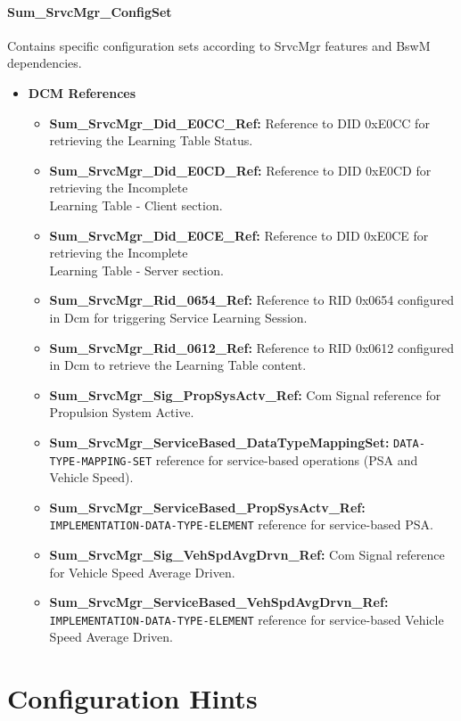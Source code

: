 \paragraph{Sum\_SrvcMgr\_ConfigSet} Contains specific configuration sets according to SrvcMgr features and BswM dependencies.
\begin{itemize}
  \item \textbf{DCM References}
    \begin{itemize}
      \item \textbf{Sum\_SrvcMgr\_Did\_E0CC\_Ref:} Reference to DID 0xE0CC for retrieving the Learning Table Status.
      \item \textbf{Sum\_SrvcMgr\_Did\_E0CD\_Ref:} Reference to DID 0xE0CD for retrieving the Incomplete \\ Learning Table - Client section.
      \item \textbf{Sum\_SrvcMgr\_Did\_E0CE\_Ref:} Reference to DID 0xE0CE for retrieving the Incomplete \\ Learning Table - Server section.
      \item \textbf{Sum\_SrvcMgr\_Rid\_0654\_Ref:} Reference to RID 0x0654 configured in Dcm for triggering Service Learning Session.
      \item \textbf{Sum\_SrvcMgr\_Rid\_0612\_Ref:} Reference to RID 0x0612 configured in Dcm to retrieve the Learning Table content.
      \item \textbf{Sum\_SrvcMgr\_Sig\_PropSysActv\_Ref:} Com Signal reference for Propulsion System Active.
      \item \textbf{Sum\_SrvcMgr\_ServiceBased\_DataTypeMappingSet:} \texttt{DATA-TYPE-MAPPING-SET} reference for service-based operations (PSA and Vehicle Speed).
      \item \textbf{Sum\_SrvcMgr\_ServiceBased\_PropSysActv\_Ref:} \texttt{IMPLEMENTATION-DATA-TYPE-ELEMENT} reference for service-based PSA.
      \item \textbf{Sum\_SrvcMgr\_Sig\_VehSpdAvgDrvn\_Ref:} Com Signal reference for Vehicle Speed Average Driven.
      \item \textbf{Sum\_SrvcMgr\_ServiceBased\_VehSpdAvgDrvn\_Ref:} \texttt{IMPLEMENTATION-DATA-TYPE-ELEMENT} reference for service-based Vehicle Speed Average Driven.     
    \end{itemize}
\end{itemize}


\section{Configuration Hints}

